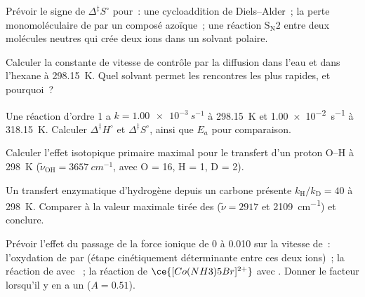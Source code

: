 \begin{exercise}[$\star$]\label{exo:b3:rate-theories:3}
Prévoir le signe de $\Delta^{\ddagger}S^\circ$ pour~: une cycloaddition
de Diels--Alder~; la perte monomoléculaire de  par un composé
azoïque~; une réaction $\mathrm{S_N2}$ entre deux molécules neutres qui
crée deux ions dans un solvant polaire.
\end{exercise}

\begin{exercise}[$\star$]\label{exo:b3:rate-theories:4}
Calculer la constante de vitesse de contrôle par la diffusion dans l'eau
et dans l'hexane à
\qty{298.15}{K}. Quel solvant permet les rencontres les plus rapides, et
pourquoi~?
\end{exercise}

\begin{exercise}[$\star\star$]\label{exo:b3:rate-theories:5}
Une réaction d'ordre 1 a $k = \qty{1.00e-3}{s^{-1}}$ à \qty{298.15}{K} et
\qty{1.00e-2}{s^{-1}} à
\qty{318.15}{K}. Calculer $\Delta^{\ddagger}H^\circ$ et
$\Delta^{\ddagger}S^\circ$, ainsi que $E_a$ pour comparaison.
\end{exercise}

\begin{exercise}[$\star\star$]\label{exo:b3:rate-theories:6}
Calculer l'effet isotopique primaire maximal pour le transfert d'un
proton O--H à
\qty{298}{K} ($\tilde\nu_{\mathrm{OH}} = \qty{3657}{cm^{-1}}$,  avec O = 16, H = 1, D = 2).
\end{exercise}

\begin{exercise}[$\star\star$]\label{exo:b3:rate-theories:7}
Un transfert enzymatique d'hydrogène depuis un carbone présente
$k_{\mathrm H}/k_{\mathrm D} = 40$ à \qty{298}{K}. Comparer
à la valeur maximale tirée des 
($\tilde\nu = 2917$ et \qty{2109}{cm^{-1}}) et conclure.
\end{exercise}

\begin{exercise}[$\star\star$]\label{exo:b3:rate-theories:8}
Prévoir l'effet du passage de la force ionique de 0 à 0.010 sur la
vitesse de~: l'oxydation de  par  (étape
cinétiquement déterminante entre ces deux ions)~; la réaction de
 avec ~; la réaction de $\ce{[Co(NH3)5Br]^{2+}}$
avec . Donner le facteur lorsqu'il y en a un ($A = 0.51$).
\end{exercise}

